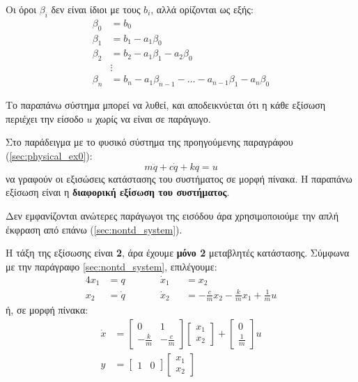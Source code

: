 \documentclass[11pt,a4paper,notitlepage,fleqn]{article}
\begin{document}
\begin{itemize}
     Οι όροι \( \beta_i \) δεν είναι ίδιοι με τους \( b_i \), αλλά ορίζονται ως εξής:
     \begin{align*}
     	\beta_0 &= b_0 \\
     	\beta_1 &= b_1 - a_1\beta_0\\
     	\beta_2 &= b_2 - a_1\beta_1 - a_2\beta_0\\
     	&\vdots\\
     	\beta_n &= b_n - a_1\beta_{n-1}-\dots - a_{n-1}\beta_1 - a_n\beta_0
     \end{align*}

     Το παραπάνω σύστημα μπορεί να λυθεί, και αποδεικνύεται ότι η κάθε εξίσωση περιέχει
     την είσοδο \( u \) χωρίς να είναι σε παράγωγο.
\end{itemize}

\begin{exercise}[Παράδειγμα]
	Στο παράδειγμα με το φυσικό σύστημα της προηγούμενης παραγράφου (\autoref{sec:physical_ex0}):
	\[
	m\ddot q + c\dot q + kq = u
	\]
	να γραφούν οι εξισώσεις κατάστασης του συστήματος σε μορφή πίνακα.
	\tcblower
	Η παραπάνω εξίσωση είναι η \textbf{διαφορική εξίσωση του συστήματος}.

	Δεν εμφανίζονται ανώτερες παράγωγοι της εισόδου άρα χρησιμοποιούμε την απλή έκφραση
	από επάνω (\autoref{sec:nontd_system}).

	Η τάξη της εξίσωσης είναι \textbf{2}, άρα έχουμε \textbf{μόνο 2} μεταβλητές κατάστασης.
	Σύμφωνα με την παράγραφο \autoref{sec:nontd_system}, επιλέγουμε:
	\begin{alignat*}{4}
		x_1 &=q \qquad && \dot x_1&&=x_2 \\
		x_2&=\dot q \qquad && \dot x_2 &&= -\frac{c}{m}x_2 - \frac{k}{m}x_1
		+ \frac{1}{m}u
	\end{alignat*}
	ή, σε μορφή πίνακα:
	\begin{align*}
		\dot x &= \left[\begin{matrix}
		0 & 1 \\ -\frac{k}{m} & -\frac{c}{m}
		\end{matrix}\right]\left[\begin{matrix}
		x_1\\x_2
		\end{matrix}
		\right]+\left[\begin{matrix}
		0\\ \frac{1}{m}
		\end{matrix}\right]u\\
		y &= \left[\begin{matrix}
		1 & 0
		\end{matrix}\right]\left[\begin{matrix}
		x_1 \\ x_2
		\end{matrix}\right]
	\end{align*}
\end{exercise}
\end{document}
